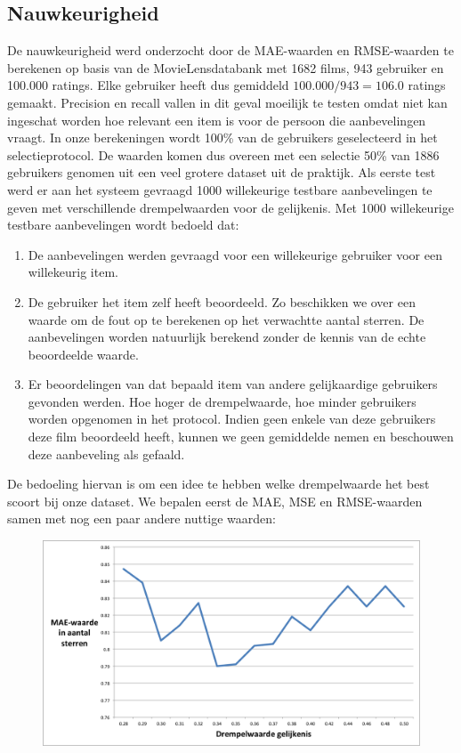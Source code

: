 \subsection{Nauwkeurigheid}
De nauwkeurigheid werd onderzocht door de MAE-waarden en RMSE-waarden te berekenen op basis van de MovieLensdatabank met 1682 films, 943 gebruiker en 100.000 ratings. Elke gebruiker heeft dus gemiddeld $100.000/943 =106.0$ ratings gemaakt. Precision en recall vallen in dit geval moeilijk te testen omdat niet kan ingeschat worden hoe relevant een item is voor de persoon die aanbevelingen vraagt. In onze berekeningen wordt 100\% van de gebruikers geselecteerd in het selectieprotocol. De waarden komen dus overeen met een selectie 50\% van 1886 gebruikers genomen uit een veel grotere dataset uit de praktijk. Als eerste test werd er aan het systeem gevraagd 1000 willekeurige testbare aanbevelingen te geven met verschillende drempelwaarden voor de gelijkenis. Met 1000 willekeurige testbare aanbevelingen wordt bedoeld dat: 
\begin{enumerate}
\item De aanbevelingen werden gevraagd voor een willekeurige gebruiker voor een willekeurig item.
\item De gebruiker het item zelf heeft beoordeeld. Zo beschikken we over een waarde om de fout op te berekenen op het verwachtte aantal sterren. De aanbevelingen worden natuurlijk berekend zonder de kennis van de echte beoordeelde waarde.
\item Er beoordelingen van dat bepaald item van andere gelijkaardige gebruikers gevonden werden. Hoe hoger de drempelwaarde, hoe minder gebruikers worden opgenomen in het protocol. Indien geen enkele van deze gebruikers deze film beoordeeld heeft, kunnen we geen gemiddelde nemen en beschouwen deze aanbeveling als gefaald.
\end{enumerate}
De bedoeling hiervan is om een idee te hebben welke drempelwaarde het best scoort bij onze dataset. We bepalen eerst de MAE, MSE en RMSE-waarden samen met nog een paar andere nuttige waarden:


\begin{figure}[htpb]   
    \label{Figuur::mae}      
  \begin{center}    
 \includegraphics[width=\textwidth]{fig/mae}    
  \end{center}   
\end{figure}
   
